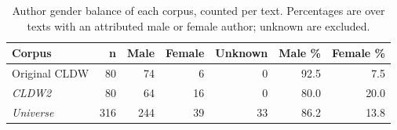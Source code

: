 \begin{table}[htbp]
\centering
\caption{Author gender balance of each corpus, counted per text. Percentages are over texts with an attributed male or female author; unknown are excluded.}
\label{tab:gender-balance}
\begin{tabular}{@{}lrrrrrr@{}}
\toprule
\textbf{Corpus} & \textbf{n} & \textbf{Male} & \textbf{Female} & \textbf{Unknown} & \textbf{Male \%} & \textbf{Female \%} \\
\midrule
Original CLDW & 80 & 74 & 6 & 0 & 92.5 & 7.5 \\
\emph{CLDW2} & 80 & 64 & 16 & 0 & 80.0 & 20.0 \\
\emph{Universe} & 316 & 244 & 39 & 33 & 86.2 & 13.8 \\
\bottomrule
\end{tabular}
\end{table}
